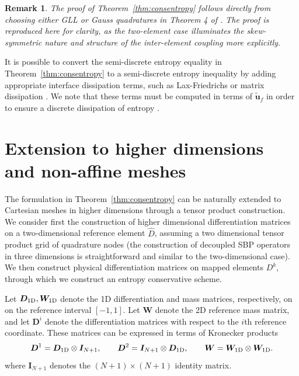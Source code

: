 \documentclass[review,onefignum,onetabnum,final]{siamart171218}
\newtheorem*{remark}{Remark}
\renewcommand{\tilde}{\widetilde}
\renewcommand{\hat}{\widehat}
\begin{document}
\begin{remark}
The proof of Theorem~\ref{thm:consentropy} follows directly from choosing either GLL or Gauss quadratures in Theorem 4 of \cite{chan2017discretely}.  The proof is reproduced here for clarity, as the two-element case illuminates the skew-symmetric nature and structure of the inter-element coupling more explicitly.  
\end{remark}

It is possible to convert the semi-discrete entropy equality in Theorem~\ref{thm:consentropy} to a semi-discrete entropy inequality by adding appropriate interface dissipation terms, such as Lax-Friedrichs or matrix dissipation \cite{winters2017uniquely}.  We note that these terms must be computed in terms of $\tilde{\bm{u}}_f$ in order to ensure a discrete dissipation of entropy \cite{chen2017entropy, chan2017discretely}.  

\section{Extension to higher dimensions and non-affine meshes}
\label{sec:2}

The formulation in Theorem~\ref{thm:consentropy} can be naturally extended to Cartesian meshes in higher dimensions through a tensor product construction.  We consider first the construction of higher dimensional differentiation matrices on a two-dimensional reference element $\hat{D}$, assuming a two dimensional tensor product grid of quadrature nodes (the construction of decoupled SBP operators in three dimensions is straightforward and similar to the two-dimensional case).  We then construct physical differentiation matrices on mapped elements $D^k$, through which we construct an entropy conservative scheme.  

Let $\bm{D}_{\rm 1D}, \bm{W}_{\rm 1D}$ denote the 1D differentiation and mass matrices, respectively, on on the reference interval $[-1,1]$.  Let ${\bm{W}}$ denote the 2D reference mass matrix, and let ${\bm{D}}^i$ denote the differentiation matrices with respect to the $i$th reference coordinate.  These matrices can be expressed in terms of Kronecker products  
\[
{\bm{D}}^1 = \bm{D}_{\rm 1D} \otimes \bm{I}_{N+1}, \qquad {\bm{D}}^2 = \bm{I}_{N+1} \otimes \bm{D}_{\rm 1D}, \qquad {\bm{W}} = \bm{W}_{\rm 1D} \otimes  \bm{W}_{\rm 1D}.
\]
where $\bm{I}_{N+1}$ denotes the $(N+1)\times (N+1)$ identity matrix.  %
\end{document}
